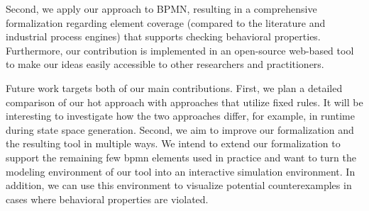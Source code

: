 \documentclass{lmcs} %
\theoremstyle{plain}\newtheorem{satz}[thm]{Satz} %
\begin{document}
Second, we apply our approach to BPMN, resulting in a comprehensive formalization regarding element coverage (compared to the literature and industrial process engines) that supports checking behavioral properties.
Furthermore, our contribution is implemented in an open-source web-based tool to make our ideas easily accessible to other researchers and practitioners.

Future work targets both of our main contributions.
First, we plan a detailed comparison of our \gls*{hot} approach with approaches that utilize fixed rules.
It will be interesting to investigate how the two approaches differ, for example, in runtime during state space generation.
Second, we aim to improve our formalization and the resulting tool in multiple ways.
We intend to extend our formalization to support the remaining few \gls*{bpmn} elements used in practice and want to turn the modeling environment of our tool into an interactive simulation environment.
In addition, we can use this environment to visualize potential counterexamples in cases where behavioral properties are violated.

  
 

\end{document}
